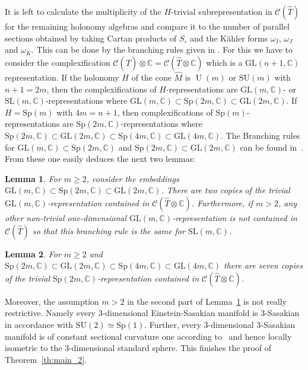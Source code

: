 \documentclass[11pt,a4paper]{article}
\theoremstyle{plain}
\newtheorem{lemma}{Lemma}
\theoremstyle{remark}
\newcommand{\I}[1]{\ensuremath{\mathbb{#1}}}
\DeclareMathOperator{\U}{U}
\newcommand{\GL}{\mathrm{GL}}
\newcommand{\SU}{\mathrm{SU}}
\newcommand{\Sp}{\mathrm{Sp}}
\newcommand{\C}{\mathbb{C}}
\newcommand{\SL}{\mathrm{SL}}
\newcommand{\scrC}{\mathcal{C}}
\begin{document}
It is left to calculate the multiplicity of the $H$-trivial
subrepresentation in $\scrC(\hat T) $ for the remaining holonomy
algebras and compare it to the number of parallel sections obtained by taking
Cartan products of $S_\circ$ and the Kähler forms $\omega_I$, $\omega_J$ and
$\omega_K$. This can be done by the branching rules given in \cite{Ho}.
For this we have to consider the complexification
$\scrC(\hat T)  \otimes \I{C} = \scrC(\hat T\otimes \C)$ which is a $\GL(n+1, \I{C})$ representation.
If the holonomy $H$ of the cone $\hat M$ is $\U(m)$ or
$\SU(m)$ with $n+1 = 2m$, then the complexifications of $H$-representations
are $\GL(m,\I{C})$- or $\SL(m,\I{C})$-representations where
$\GL(m, \I{C}) \subset \Sp(2m, \I{C}) \subset \GL(2m, \I{C})$. If $H = \Sp(m)$
with $4m=n+1$, then complexifications of $\Sp(m)$-representations are
$\Sp(2m,\I{C})$-representations where $\Sp(2m,\I{C}) \subset \GL(2m,\I{C})
\subset \Sp(4m,\I{C}) \subset \GL(4m,\I{C})$. The Branching rules for $\GL(m, \I{C})\subset\Sp(2m,\I{C})$ and 
$\Sp(2m, \I{C}) \subset \GL(2m, \I{C})$ can be found in~\cite{Ho}. From these one easily deduces the next two lemmas:

\bigskip
\begin{lemma} \label{lem:sasaki:um}
  For $m \ge 2$, consider the embeddings $\GL(m,\I{C}) \subset \Sp(2m,\I{C})
  \subset \GL(2m,\I{C})$. There are two copies of the trivial $\GL(m,\I{C})$-representation contained in
  $\scrC(\hat T\otimes \C)$. Furthermore, if $m>2$, any other
  non-trivial one-dimensional $\GL(m,\I{C})$-representation is not
  contained in $\scrC(\hat T)$ so that this branching rule is
  the same for $\SL(m,\I{C})$.
\end{lemma}

\bigskip
\begin{lemma} \label{lem:sasaki:spm}
  For $m \ge 2$ and $\Sp(2m,\I{C}) \subset \GL(2m,\I{C}) \subset \Sp(4m,\I{C})
  \subset \GL(4m,\I{C})$ there are seven copies of the trivial $\Sp(2m,\I{C})$-representation contained in $\scrC(\hat T\otimes \C)$.
\end{lemma}

Moreover, the assumption $m>2$ in the second part of Lemma~\ref{lem:sasaki:um} is not really restrictive. Namely every 3-dimensional Einstein-Sasakian manifold is 3-Sasakian in accordance with $\SU(2) \simeq \Sp(1)$. Further, every 3-dimensional 3-Sasakian manifold is of constant sectional curvature one according to~\cite[Proposition~1.1.2~(iii)]{BG} and hence locally isometric to the 3-dimensional standard sphere. This finishes the proof of Theorem~\ref{th:main_2}.
\end{document}
